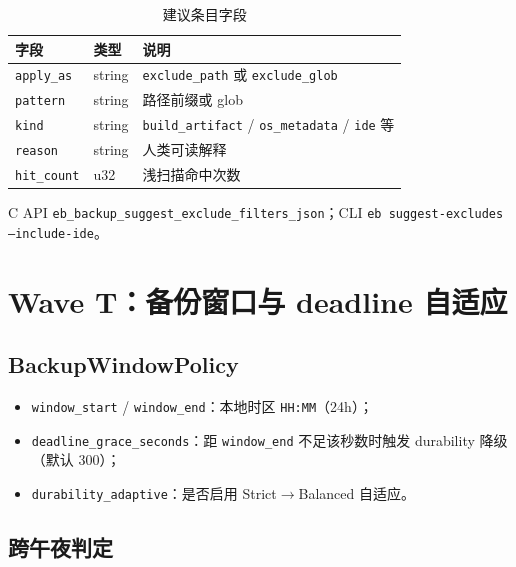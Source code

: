 \begin{table}[htbp]
\centering
\caption{建议条目字段}
\small
\begin{tabular}{@{}llp{6cm}@{}}
\toprule
字段 & 类型 & 说明 \\
\midrule
\texttt{apply\_as} & string & \texttt{exclude\_path} 或 \texttt{exclude\_glob} \\
\texttt{pattern} & string & 路径前缀或 glob \\
\texttt{kind} & string & \texttt{build\_artifact} / \texttt{os\_metadata} / \texttt{ide} 等 \\
\texttt{reason} & string & 人类可读解释 \\
\texttt{hit\_count} & u32 & 浅扫描命中次数 \\
\bottomrule
\end{tabular}
\end{table}

C API \texttt{eb\_backup\_suggest\_exclude\_filters\_json}；CLI \texttt{eb suggest-excludes --include-ide}。

\section{Wave T：备份窗口与 deadline 自适应}
\label{sec:cap-backup-window}

\subsection{BackupWindowPolicy}

\begin{structbox}
\begin{itemize}[nosep]
  \item \texttt{window\_start} / \texttt{window\_end}：本地时区 \texttt{HH:MM}（24h）；
  \item \texttt{deadline\_grace\_seconds}：距 \texttt{window\_end} 不足该秒数时触发 durability 降级（默认 300）；
  \item \texttt{durability\_adaptive}：是否启用 Strict$\rightarrow$Balanced 自适应。
\end{itemize}
\end{structbox}

\subsection{跨午夜判定}

